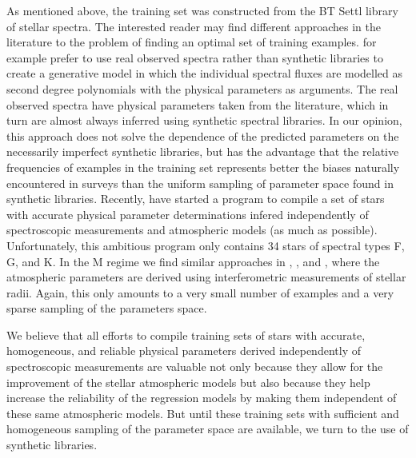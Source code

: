 As mentioned above, the training set was constructed from the BT Settl
library of stellar spectra. The interested reader may find different
approaches in the literature to the problem of finding an optimal set
of training examples. \cite{hoggCannon} for example prefer to use real
observed spectra rather than synthetic libraries to create a
generative model in which the individual spectral fluxes are modelled
as second degree polynomials with the physical parameters as
arguments. The real observed spectra have physical parameters taken
from the literature, which in turn are almost always inferred using
synthetic spectral libraries. In our opinion, this approach does not
solve the dependence of the predicted parameters on the necessarily
imperfect synthetic libraries, but has the advantage that the relative
frequencies of examples in the training set represents better the
biases naturally encountered in surveys than the uniform sampling of
parameter space found in synthetic libraries. Recently, \cite{heiter}
have started a program to compile a set of stars with accurate
physical parameter determinations infered independently of
spectroscopic measurements and atmospheric models (as much as
possible). Unfortunately, this ambitious program only contains 34
stars of spectral types F, G, and K. In the M regime we find similar
approaches in \cite{dummy}, \cite{dummy}, and \cite{dummy}, where the
atmospheric parameters are derived using interferometric measurements
of stellar radii. Again, this only amounts to a very small number of
examples and a very sparse sampling of the parameters space.

We believe that all efforts to compile training sets of stars with
accurate, homogeneous, and reliable physical parameters derived
independently of spectroscopic measurements are valuable not only
because they allow for the improvement of the stellar atmospheric
models but also because they help increase the reliability of the
regression models by making them independent of these same atmospheric
models. But until these training sets with sufficient and homogeneous
sampling of the parameter space are available, we turn to the use of
synthetic libraries. 


